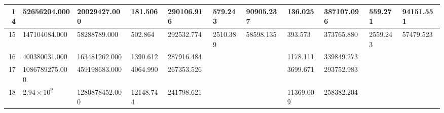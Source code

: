 \documentclass[conference]{IEEEtran}
\newcommand{\matr}[1]{\mathbf{#1}} %
\begin{document}
\begin{table*}[tb]
\begin{threeparttable}[c]
\begin{tabular}{r|ll|ll|ll|ll|ll}
\hline                                                                                                                                                                                                          
14 & \num{52656204.000} & \num{20029427.000} & \num{181.506} & \num{290106.916} & \num{579.243} & \num{90905.237} & \num{136.025} & \num{387107.096} & \num{559.271} & \num{94151.551} \\   
\hline                                                                                                                                                                                                          
15 & \num{147104084.000} & \num{58288789.000} & \num{502.864} & \num{292532.774} & \num{2510.389} & \num{58598.135} & \num{393.573} & \num{373765.880} & \num{2559.243} & \num{57479.523} \\
\hline                                                                                                                                                                                                          
16 & \num{400380031.000} & \num{163481262.000} & \num{1390.612} & \num{287916.484} &  &  & \num{1178.111} & \num{339849.273} &  &  \\                                                               
\hline                                                                                                                                                                                                          
17 & \num{1086789275.000} & \num{459198683.000} & \num{4064.990} & \num{267353.526} &  &  & \num{3699.671} & \num{293752.983} &  &  \\                                                              
\hline                                                                                                                                                                                                          
18 & $2.94 \times 10^9$
& \num{1280878452.000} & \num{12148.744} & \num{241798.621} &  &  & \num{11369.009} & \num{258382.204} &  &  \\
\end{tabular}
\end{threeparttable}
\vspace{-2.5em}
\end{table*}
\end{document}
